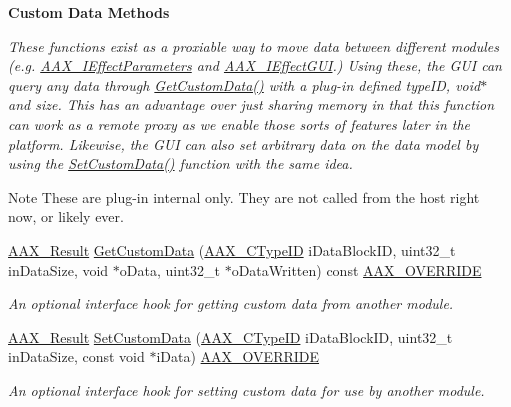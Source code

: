 \begin{Indent}\textbf{ Custom Data Methods}\par
{\em These functions exist as a proxiable way to move data between different modules (e.\+g. \mbox{\hyperlink{a01825}{A\+A\+X\+\_\+\+I\+Effect\+Parameters}} and \mbox{\hyperlink{a01821}{A\+A\+X\+\_\+\+I\+Effect\+G\+UI}}.) Using these, the G\+UI can query any data through \mbox{\hyperlink{a01481_afc82be9a9444bc8bc4a82e8ea370d88e}{Get\+Custom\+Data()}} with a plug-\/in defined {\ttfamily type\+ID}, {\ttfamily void$\ast$} and size. This has an advantage over just sharing memory in that this function can work as a remote proxy as we enable those sorts of features later in the platform. Likewise, the G\+UI can also set arbitrary data on the data model by using the \mbox{\hyperlink{a01481_a2905b5ec2ef715cd9000c8f1902e13d3}{Set\+Custom\+Data()}} function with the same idea.

\begin{DoxyNote}{Note}
These are plug-\/in internal only. They are not called from the host right now, or likely ever. 
\end{DoxyNote}
}\begin{DoxyCompactItemize}
\item 
\mbox{\hyperlink{a00392_a4d8f69a697df7f70c3a8e9b8ee130d2f}{A\+A\+X\+\_\+\+Result}} \mbox{\hyperlink{a01481_afc82be9a9444bc8bc4a82e8ea370d88e}{Get\+Custom\+Data}} (\mbox{\hyperlink{a00392_ac678f9c1fbcc26315d209f71a147a175}{A\+A\+X\+\_\+\+C\+Type\+ID}} i\+Data\+Block\+ID, uint32\+\_\+t in\+Data\+Size, void $\ast$o\+Data, uint32\+\_\+t $\ast$o\+Data\+Written) const \mbox{\hyperlink{a00392_ac2f24a5172689ae684344abdcce55463}{A\+A\+X\+\_\+\+O\+V\+E\+R\+R\+I\+DE}}
\begin{DoxyCompactList}\small\item\em An optional interface hook for getting custom data from another module. \end{DoxyCompactList}\item 
\mbox{\hyperlink{a00392_a4d8f69a697df7f70c3a8e9b8ee130d2f}{A\+A\+X\+\_\+\+Result}} \mbox{\hyperlink{a01481_a2905b5ec2ef715cd9000c8f1902e13d3}{Set\+Custom\+Data}} (\mbox{\hyperlink{a00392_ac678f9c1fbcc26315d209f71a147a175}{A\+A\+X\+\_\+\+C\+Type\+ID}} i\+Data\+Block\+ID, uint32\+\_\+t in\+Data\+Size, const void $\ast$i\+Data) \mbox{\hyperlink{a00392_ac2f24a5172689ae684344abdcce55463}{A\+A\+X\+\_\+\+O\+V\+E\+R\+R\+I\+DE}}
\begin{DoxyCompactList}\small\item\em An optional interface hook for setting custom data for use by another module. \end{DoxyCompactList}\end{DoxyCompactItemize}
\end{Indent}
